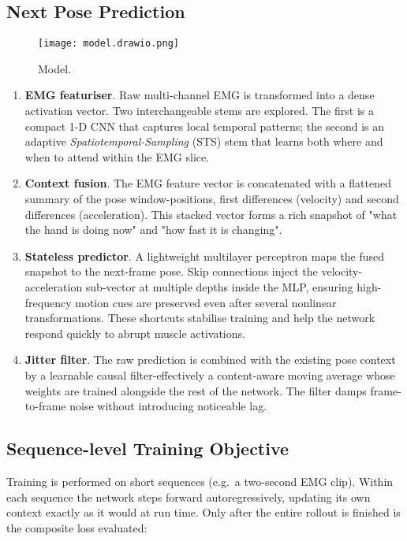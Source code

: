 \subsection{Next Pose Prediction}

\begin{figure}[H]
    \centering
    \texttt{[image: model.drawio.png]}
    \caption{Model.}
    \label{fig:model}
\end{figure}

\begin{enumerate}[label=\arabic*.]
  \item \textbf{EMG featuriser}.
        Raw multi-channel EMG is transformed into a dense activation vector.
        Two interchangeable stems are explored.
        The first is a compact 1-D CNN that captures local temporal patterns;
        the second is an adaptive \emph{Spatiotemporal-Sampling} (STS) stem that
        learns both where and when to attend within the EMG slice.
  \item \textbf{Context fusion}.
        The EMG feature vector is concatenated with a flattened summary of the
        pose window-positions, first differences (velocity) and second
        differences (acceleration). This stacked vector forms a rich snapshot
        of "what the hand is doing now" and "how fast it is changing".
  \item \textbf{Stateless predictor}.
        A lightweight multilayer perceptron maps the fused snapshot to the
        next-frame pose. Skip connections inject the velocity-acceleration
        sub-vector at multiple depths inside the MLP, ensuring high-frequency
        motion cues are preserved even after several nonlinear transformations.
        These shortcuts stabilise training and help the network respond quickly
        to abrupt muscle activations.
  \item \textbf{Jitter filter}.
        The raw prediction is combined with the existing pose context by a
        learnable causal filter-effectively a content-aware moving average
        whose weights are trained alongside the rest of the network. The
        filter damps frame-to-frame noise without introducing noticeable lag.
\end{enumerate}

\subsection{Sequence-level Training Objective}

Training is performed on short sequences (e.g.\ a two-second EMG clip).
Within each sequence the network steps forward autoregressively, updating its own context exactly as it would at run time. Only after the entire rollout is finished is the composite loss evaluated:

